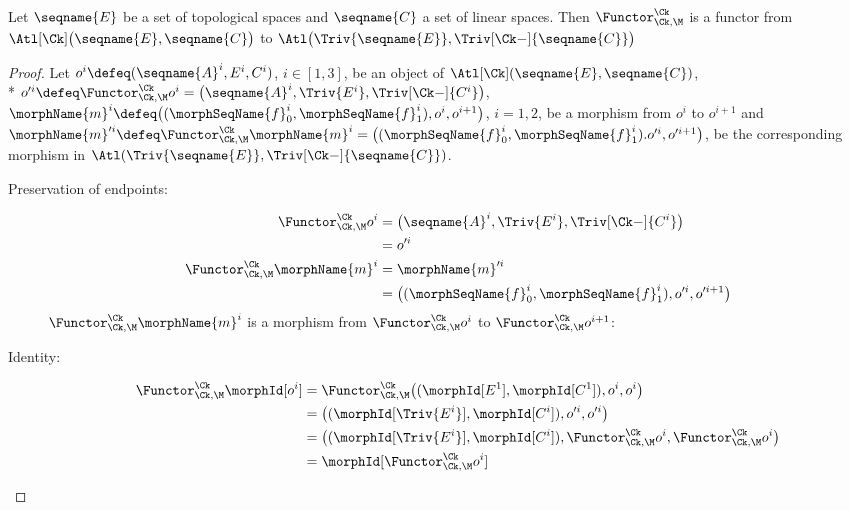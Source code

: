 \documentclass{article}
\begin{document}
\begin{theorem}
\label{the:Func-Ck-M}
Let $\seqname{E}$ be a set of topological spaces and $\seqname{C}$ a
set of linear spaces. Then
$\Functor^\Ck_{\Ck,\M}$ is a functor from
$\Atl[\Ck] \bigl ( \seqname{E}, \seqname{C} \bigl )$
to
$\Atl \bigl ( \Triv{\seqname{E}}, \Triv[\Ck-]{\seqname{C}} \bigl )$

\begin{proof}
Let $o^i \defeq (\seqname{A}^i, E^i, C^i)$,
$i \in [1,3]$, be an object of $\Atl[\Ck](\seqname{E}, \seqname{C})$, \\*
$
  o'^i \defeq
  \Functor^\Ck_{\Ck,\M} o^i
  =
  \bigl (
     \seqname{A}^i,
     \Triv{E^i},
     \Triv[\Ck-]{C^i}
   \bigr )
$,
$
  \morphName{m}^i \defeq
    \bigl (
      (\morphSeqName{f}^i_0, \morphSeqName{f}^i_1),
      o^i,
      o^{i+1}
    \bigr )
$, $i=1,2$,
be a morphism from $o^i$ to $o^{i+1}$ and
$
  \morphName{m}'^i \defeq
  \Functor^\Ck_{\Ck,\M} \morphName{m}^i
  =
    \bigl (
      (\morphSeqName{f}^i_0, \morphSeqName{f}^i_1).
      o'^i,
      o'^{i+1}
    \bigr )
$,
be the corresponding morphism in
$\Atl(\Triv{\seqname{E}}, \Triv[\Ck-]{\seqname{C}})$.

\begin{description}
\item[Preservation of endpoints:]
\begin{align*}
  \Functor^\Ck_{\Ck,\M} o^i
  & =
  \bigl (
     \seqname{A}^i,
     \Triv{E^i},
     \Triv[\Ck-]{C^i}
   \bigr )
\\*
  & =
  o'^i
\\*
  \Functor^\Ck_{\Ck,\M} \morphName{m}^i
  & =
  \morphName{m}'^i
\\*
  & =
    \bigl (
      (
        \morphSeqName{f}^i_0,
        \morphSeqName{f}^i_1
      ),
     o'^i,
     o'^{i+1}
    \bigr )
\end{align*}
$\Functor^\Ck_{\Ck,\M} \morphName{m}^i$ is a morphism from
$\Functor^\Ck_{\Ck,\M} o^i$ to $\Functor^\Ck_{\Ck,\M} o^{i+1}$:

\item[Identity:]
\begin{align*}
  \Functor^\Ck_{\Ck,\M} \morphId[{o^i}]
  & =
  \Functor^\Ck_{\Ck,\M}
    \bigl (
      (\morphId[{E^1}], \morphId[{C^1}]),
      o^i,
      o^i
    \bigr )
\\*
  & =
  \bigl (
    (\morphId[{\Triv{E^i}}], \morphId[{C^i}]),
    o'^i,
    o'^i
  \bigr )
\\*
  & =
  \bigl (
    (\morphId[{\Triv{E^i}}], \morphId[{C^i}]),
    \Functor^\Ck_{\Ck,\M} o^i,
    \Functor^\Ck_{\Ck,\M} o^i
  \bigr )
\\*
  & =
  \morphId[{\Functor^\Ck_{\Ck,\M} o^i}]
\end{align*}


\end{description}
\end{proof}
\end{theorem}
\end{document}

